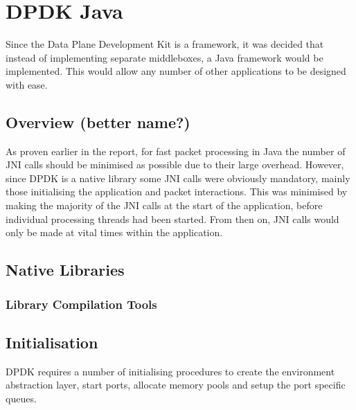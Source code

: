 \documentclass[final_report.tex]{subfiles}
\begin{document}
\section{DPDK Java}
Since the Data Plane Development Kit is a framework, it was decided that instead of implementing separate middleboxes, a Java framework would be implemented. This would allow any number of other applications to be designed with ease. 

\subsection{Overview (better name?)}
As proven earlier in the report, for fast packet processing in Java the number of JNI calls should be minimised as possible due to their large overhead. However, since DPDK is a native library some JNI calls were obviously mandatory, mainly those initialising the application and packet interactions. This was minimised by making the majority of the JNI calls at the start of the application, before individual processing threads had been started. From then on, JNI calls would only be made at vital times within the application.

\subsection{Native Libraries}

\subsubsection{Library Compilation Tools}

\subsection{Initialisation}
DPDK requires a number of initialising procedures to create the environment abstraction layer, start ports, allocate memory pools and setup the port specific queues.
\end{document}
